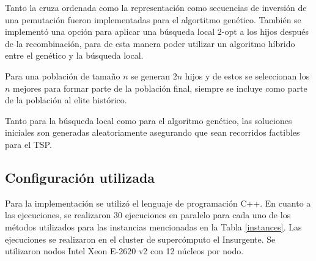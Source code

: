 \par Tanto la cruza ordenada como la representación como secuencias de inversión de una pemutación fueron implementadas para el algortitmo genético. También se implementó una opción para aplicar una búsqueda local $2$-opt a los hijos después de la recombinación, para de esta manera poder utilizar un algoritmo híbrido entre el genético y la búsqueda local. 
\par Para una población de tamaño $n$ se generan $2n$ hijos y de estos se seleccionan los $n$ mejores para formar parte de la población final, siempre se incluye como parte de la población al elite histórico.
\par Tanto para la búsqueda local como para el algoritmo genético, las soluciones iniciales son generadas aleatoriamente asegurando que sean recorridos factibles para el TSP.
\subsection*{Configuración utilizada}
Para la implementación se utilizó el lenguaje de programación C++. En cuanto a las ejecuciones, se realizaron 30 ejecuciones en paralelo para cada uno de los métodos utilizados para las instancias mencionadas en la Tabla \ref{instances}. Las ejecuciones se realizaron en el cluster de supercómputo el Insurgente. Se utilizaron nodos Intel Xeon E-2620 v2 con 12 núcleos por nodo.
